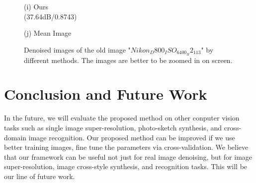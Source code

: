 \documentclass[10pt,twocolumn,letterpaper]{article}
\begin{document}
\begin{figure}
{\begin{minipage}[t]{0.2\textwidth}
{\footnotesize (i) Ours \\  (37.64dB/0.8743) }
\end{minipage}
\begin{minipage}[t]{0.2\textwidth}
\centering
{}
{\footnotesize (j) Mean Image }
\end{minipage}
}
\caption{Denoised images of the old image "$Nikon_D800_ISO_6400_B2_113$" by different methods. The images are better to be zoomed in on screen.}
\label{fig2}
\end{figure}

\section{Conclusion and Future Work}

In the future, we will evaluate the proposed method on other conputer vision tasks such as single image super-resolution, photo-sketch synthesis, and cross-domain image recognition. Our proposed method can be improved if we use better training images, fine tune the parameters via cross-validation. We believe that our framework can be useful not just for real image denoising, but for image super-resolution, image cross-style synthesis, and recognition tasks. This will be our line of future work.

{\small


}
\end{document}
